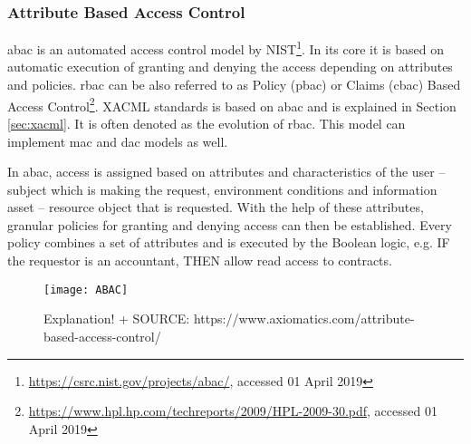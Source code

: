 \subsubsection{Attribute Based Access Control} \label{ABAC_SOTA}

\acrfull{abac} is an automated access control model by NIST\footnote{\url{https://csrc.nist.gov/projects/abac/}, accessed 01 April 2019}. In its core it is based on automatic execution of granting and denying the access depending on attributes and policies. \acrshort{rbac} can be also referred to as Policy (\acrshort{pbac}) or Claims (\acrshort{cbac}) Based Access Control\footnote{\url{https://www.hpl.hp.com/techreports/2009/HPL-2009-30.pdf}, accessed 01 April 2019}. XACML standards is based on \acrshort{abac} and is explained in Section \ref{sec:xacml}. It is often denoted as the evolution of \acrshort{rbac}. This model can implement \acrshort{mac} and \acrshort{dac} models as well.

In \acrshort{abac}, access is assigned based on attributes and characteristics of the user – subject which is making the request, environment conditions and information asset – resource object that is requested. With the help of these attributes, granular policies for granting and denying access can then be established. Every policy combines a set of attributes and is executed by the Boolean logic, e.g. IF the requestor is an accountant, THEN allow read access to contracts.

\begin{figure}[ht]
    \centering
    \texttt{[image: ABAC]}
    \caption{Explanation! + SOURCE: https://www.axiomatics.com/attribute-based-access-control/}
    \label{fig:ABAC_diagram_sota}
\end{figure}